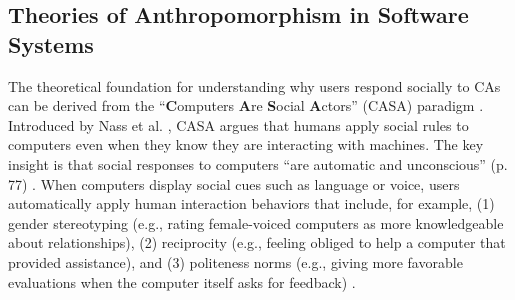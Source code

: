 \documentclass[manuscript,screen,review,anonymous]{acmart}
\begin{document}
\subsection{Theories of Anthropomorphism in Software Systems}


The theoretical foundation for understanding why users respond socially to CAs can be derived from the ``\textbf{C}omputers \textbf{A}re \textbf{S}ocial \textbf{A}ctors'' (CASA) paradigm \cite{nass2000researching}. Introduced by Nass et al. \cite{nass1994computers}, CASA argues that humans apply social rules to computers even when they know they are interacting with machines. The key insight is that social responses to computers ``are automatic and
unconscious'' (p. 77) \citep{nass1994computers}. When computers display social cues such as language or voice, users automatically apply human interaction behaviors that include, for example, (1) gender stereotyping (e.g., rating female-voiced computers as more knowledgeable about relationships), (2) reciprocity (e.g., feeling obliged to help a computer that provided assistance), and (3) politeness norms (e.g., giving more favorable evaluations when the computer itself asks for feedback) \citep{nass1997machines}. 
\end{document}
